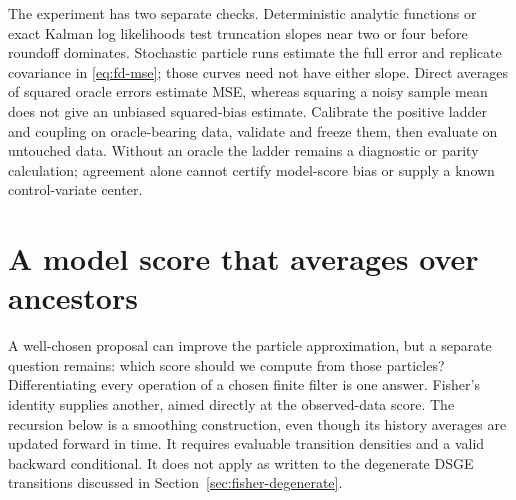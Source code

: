 \documentclass[11pt]{article}
\begin{document}
The experiment has two separate checks. Deterministic analytic functions or
exact Kalman log likelihoods test truncation slopes near two or four before
roundoff dominates. Stochastic particle runs estimate the full error and
replicate covariance in \eqref{eq:fd-mse}; those curves need not have either
slope. Direct averages of squared oracle errors estimate MSE, whereas squaring
a noisy sample mean does not give an unbiased squared-bias estimate. Calibrate
the positive ladder and coupling on oracle-bearing data, validate and freeze
them, then evaluate on untouched data. Without an oracle the ladder remains a
diagnostic or parity calculation; agreement alone cannot certify model-score
bias or supply a known control-variate center.

\section{A model score that averages over ancestors}
\label{sec:fisher}

A well-chosen proposal can improve the particle approximation, but a separate question
remains: which score should we compute from those particles? Differentiating
every operation of a chosen finite filter is one answer. Fisher's identity
supplies another, aimed directly at the observed-data score. The recursion
below is a smoothing construction, even though its history averages are
updated forward in time. It requires evaluable transition densities and a
valid backward conditional. It does not apply as written to the degenerate
DSGE transitions discussed in Section~\ref{sec:fisher-degenerate}.
\end{document}
